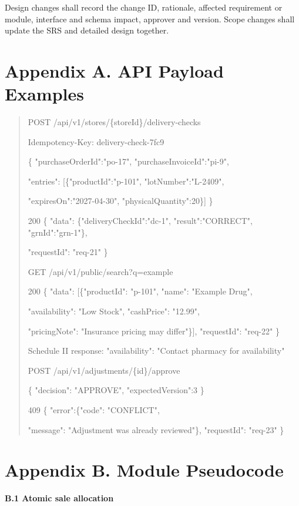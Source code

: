 Design changes shall record the change ID, rationale, affected requirement or module, interface and schema impact, approver and version. Scope changes shall update the SRS and detailed design together.

\clearpage
\section{Appendix A. API Payload Examples}\label{appendix-a.-api-payload-examples}

\begin{quote}
POST /api/v1/stores/\{storeId\}/delivery-checks

Idempotency-Key: delivery-check-7fc9

\{ "purchaseOrderId":"po-17", "purchaseInvoiceId":"pi-9",

"entries": [\{"productId":"p-101", "lotNumber":"L-2409",

"expiresOn":"2027-04-30", "physicalQuantity":20\}] \}

200 \{ "data": \{"deliveryCheckId":"dc-1", "result":"CORRECT", "grnId":"grn-1"\},

"requestId": "req-21" \}

GET /api/v1/public/search?q=example

200 \{ "data": {[}\{"productId": "p-101", "name": "Example Drug",

"availability": "Low Stock", "cashPrice": "12.99",

"pricingNote": "Insurance pricing may differ"\}{]}, "requestId": "req-22" \}

Schedule II response: "availability": "Contact pharmacy for availability"

POST /api/v1/adjustments/\{id\}/approve

\{ "decision": "APPROVE", "expectedVersion":3 \}

409 \{ "error":\{"code": "CONFLICT",

"message": "Adjustment was already reviewed"\}, "requestId": "req-23" \}
\end{quote}

\clearpage
\section{Appendix B. Module Pseudocode}\label{appendix-b.-module-pseudocode}

\textbf{B.1 Atomic sale allocation}

